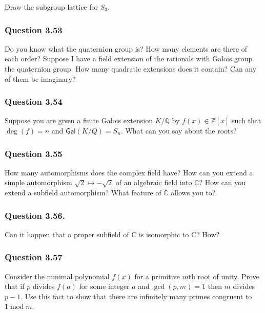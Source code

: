 Draw the subgroup lattice for \(S_3\).

\hypertarget{question-3.53}{%
\subsubsection{Question 3.53}\label{question-3.53}}

Do you know what the quaternion group is? How many elements are there of
each order? Suppose I have a field extension of the rationals with
Galois group the quaternion group. How many quadratic extensions does it
contain? Can any of them be imaginary?

\hypertarget{question-3.54}{%
\subsubsection{Question 3.54}\label{question-3.54}}

Suppose you are given a finite Galois extension \(K/{\mathbb{Q}}\) by
\(f(x) \in {\mathbb{Z}}[x]\) such that \(\deg(f ) = n\) and
\({ \mathsf{Gal}} (K/Q) = S_n\). What can you say about the roots?

\hypertarget{question-3.55}{%
\subsubsection{Question 3.55}\label{question-3.55}}

How many automorphisms does the complex field have? How can you extend a
simple automorphism \(\sqrt{2} \mapsto -\sqrt{2}\) of an algebraic field
into \({\mathbb{C}}\)? How can you extend a subfield automorphism? What
feature of \({\mathbb{C}}\) allows you to?

\hypertarget{question-3.56.}{%
\subsubsection{Question 3.56.}\label{question-3.56.}}

Can it happen that a proper subfield of C is isomorphic to C? How?

\hypertarget{question-3.57}{%
\subsubsection{Question 3.57}\label{question-3.57}}

Consider the minimal polynomial \(f(x)\) for a primitive \(m\)th root of
unity. Prove that if \(p\) divides \(f(a)\) for some integer \(a\) and
\(\gcd(p, m) = 1\) then \(m\) divides \(p - 1\). Use this fact to show
that there are infinitely many primes congruent to
\(1 \operatorname{mod}m\).

